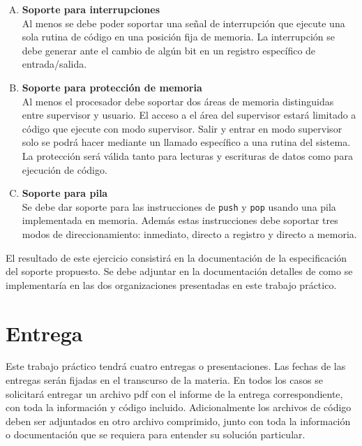 \documentclass[a4paper,11pt]{article}
\begin{document}
\begin{enumerate}[A.]
 \item \textbf{Soporte para interrupciones}\\
 Al menos se debe poder soportar una señal de interrupción que ejecute una sola rutina de código en una posición fija de memoria.
 La interrupción se debe generar ante el cambio de algún bit en un registro específico de entrada/salida.
 \item \textbf{Soporte para protección de memoria}\\
 Al menos el procesador debe soportar dos áreas de memoria distinguidas entre supervisor y usuario. El acceso a el área del supervisor estará limitado a código que ejecute con modo supervisor.
 Salir y entrar en modo supervisor solo se podrá hacer mediante un llamado específico a una rutina del sistema. La protección será válida tanto para lecturas y escrituras de datos como para ejecución de código.
 \item \textbf{Soporte para pila}\\
 Se debe dar soporte para las instrucciones de \texttt{push} y \texttt{pop} usando una pila implementada en memoria. Además estas instrucciones debe soportar tres modos de direccionamiento: inmediato, directo a registro y directo a memoria.
\end{enumerate}

El resultado de este ejercicio consistirá en la documentación de la especificación del soporte propuesto. Se debe adjuntar en la documentación detalles de como se implementaría en las dos organizaciones presentadas en este trabajo práctico.

\section{Entrega}

Este trabajo práctico tendrá cuatro entregas o presentaciones. Las fechas de las entregas serán fijadas en el transcurso de la materia.
En todos los casos se solicitará entregar un archivo pdf con el informe de la entrega correspondiente, con toda la información y código incluido.
Adicionalmente los archivos de código deben ser adjuntados en otro archivo comprimido, junto con toda la información o documentación que se requiera para entender su solución particular.
\end{document}
